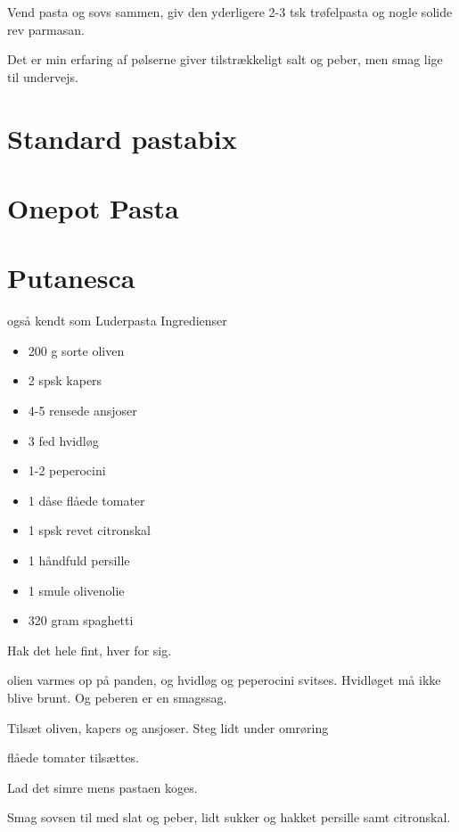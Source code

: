 \documentclass[
  letterpaper,
  DIV=11,
  numbers=noendperiod]{scrreprt}
\providecommand{\tightlist}{%
  \setlength{\itemsep}{0pt}\setlength{\parskip}{0pt}}\usepackage{longtable,booktabs,array}
\begin{document}
Vend pasta og sovs sammen, giv den yderligere 2-3 tsk trøfelpasta og
nogle solide rev parmasan.

Det er min erfaring af pølserne giver tilstrækkeligt salt og peber, men
smag lige til undervejs.

\hypertarget{standard-pastabix}{%
\section{Standard pastabix}\label{standard-pastabix}}

\hypertarget{onepot-pasta}{%
\section{Onepot Pasta}\label{onepot-pasta}}

\hypertarget{putanesca}{%
\section{Putanesca}\label{putanesca}}

også kendt som Luderpasta Ingredienser

\begin{itemize}
\tightlist
\item
  200 g sorte oliven
\item
  2 spsk kapers
\item
  4-5 rensede ansjoser
\item
  3 fed hvidløg
\item
  1-2 peperocini
\item
  1 dåse flåede tomater
\item
  1 spsk revet citronskal
\item
  1 håndfuld persille
\item
  1 smule olivenolie
\item
  320 gram spaghetti
\end{itemize}

Hak det hele fint, hver for sig.

olien varmes op på panden, og hvidløg og peperocini svitses. Hvidløget
må ikke blive brunt. Og peberen er en smagssag.

Tilsæt oliven, kapers og ansjoser. Steg lidt under omrøring

flåede tomater tilsættes.

Lad det simre mens pastaen koges.

Smag sovsen til med slat og peber, lidt sukker og hakket persille samt
citronskal.
\end{document}
